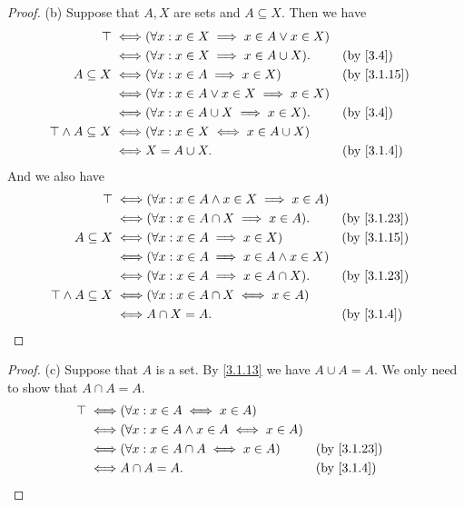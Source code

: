 \begin{proof}{(b)}
  Suppose that \(A, X\) are sets and \(A \subseteq X\).
  Then we have
  \begin{align*}
    \top \iff                     & (\forall x : x \in X \implies x \in A \lor x \in X)                             \\
    \iff                          & (\forall x : x \in X \implies x \in A \cup X).      &  & \text{(by \cref{3.4})} \\
    A \subseteq X \iff            & (\forall x : x \in A \implies x \in X)              &  & \by{3.1.15}            \\
    \iff                          & (\forall x : x \in A \lor x \in X \implies x \in X)                             \\
    \iff                          & (\forall x : x \in A \cup X \implies x \in X).      &  & \text{(by \cref{3.4})} \\
    \top \land A \subseteq X \iff & (\forall x : x \in X \iff x \in A \cup X)                                       \\
    \iff                          & X = A \cup X.                                       &  & \by{3.1.4}
  \end{align*}
  And we also have
  \begin{align*}
    \top \iff                     & (\forall x : x \in A \land x \in X \implies x \in A)                  \\
    \iff                          & (\forall x : x \in A \cap X \implies x \in A).       &  & \by{3.1.23} \\
    A \subseteq X \iff            & (\forall x : x \in A \implies x \in X)               &  & \by{3.1.15} \\
    \iff                          & (\forall x : x \in A \implies x \in A \land x \in X)                  \\
    \iff                          & (\forall x : x \in A \implies x \in A \cap X).       &  & \by{3.1.23} \\
    \top \land A \subseteq X \iff & (\forall x : x \in A \cap X \iff x \in A)                             \\
    \iff                          & A \cap X = A.                                        &  & \by{3.1.4}
  \end{align*}
\end{proof}

\begin{proof}{(c)}
  Suppose that \(A\) is a set.
  By \cref{3.1.13} we have \(A \cup A = A\).
  We only need to show that \(A \cap A = A\).
  \begin{align*}
    \top \iff & (\forall x : x \in A \iff x \in A)                                \\
    \iff      & (\forall x : x \in A \land x \in A \iff x \in A)                  \\
    \iff      & (\forall x : x \in A \cap A \iff x \in A)        &  & \by{3.1.23} \\
    \iff      & A \cap A = A.                                    &  & \by{3.1.4}
  \end{align*}
\end{proof}

